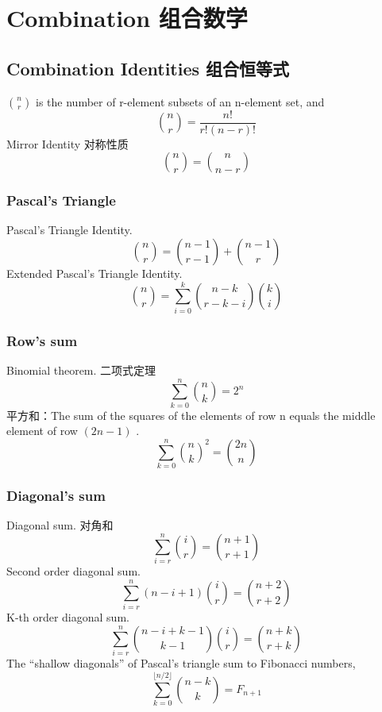 \section{Combination 组合数学}
\subsection{Combination Identities 组合恒等式}
${n}\choose{r}$ is the number of r-element subsets of an n-element set\cite{comb1}, and
\begin{equation}
{{n}\choose{r}} = \frac{n!}{r!(n-r)!}
\end{equation}
Mirror Identity 对称性质
\begin{equation}
{{n}\choose{r}} = {{n}\choose{n-r}}
\end{equation}

\subsubsection{Pascal's Triangle}
Pascal's Triangle Identity\cite{comb1}.
\begin{equation}
{{n}\choose{r}} = {{n-1}\choose{r-1}} + {{n-1}\choose{r}}
\end{equation}
Extended Pascal's Triangle Identity\cite{comb1}.
\begin{equation}
{{n}\choose{r}} = \sum \limits_{i=0}^k{{{n-k}\choose{r-k-i}}{{k}\choose{i}}}
\end{equation}

\subsubsection{Row's sum}
Binomial theorem. 二项式定理
\begin{equation}
\sum \limits_{k=0}^n{{n}\choose{k}} = 2^n
\end{equation}
平方和：The sum of the squares of the elements of row n equals the middle element of row $(2n - 1)$ \cite{comb2}.
\begin{equation}
\sum \limits_{k=0}^n{{{n}\choose{k}}^2} = {{2n}\choose{n}}
\end{equation}

\subsubsection{Diagonal's sum}
Diagonal sum\cite{comb1}. 对角和
\begin{equation}
\sum \limits_{i=r}^n{{i}\choose{r}} = {{n+1}\choose{r+1}}
\end{equation}
Second order diagonal sum\cite{comb1}.
\begin{equation}
\sum \limits_{i=r}^n{(n-i+1){{i}\choose{r}}} = {{n+2}\choose{r+2}}
\end{equation}
K-th order diagonal sum\cite{comb1}.
\begin{equation}
\sum \limits_{i=r}^n{{{n-i+k-1}\choose{k-1}}{{i}\choose{r}}} = {{n+k}\choose{r+k}}
\end{equation}
The ``shallow diagonals'' of Pascal's triangle sum to Fibonacci numbers\cite{comb3},
\begin{equation}
\sum \limits_{k=0}^{\lfloor n/2 \rfloor}{{n-k}\choose{k}} = F_{n+1}
\end{equation}

